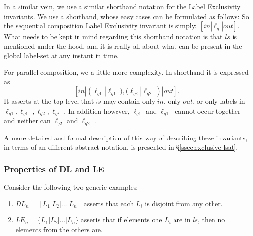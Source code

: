 In a similar vein, we use a similar shorthand notation
for the Label Exclusivity invariants.
We use a shorthand,
whose easy cases can be formulated as follows:
So the sequential composition Label Exclusivity invariant
is simply: $[in|\ell_g|out]$.
What needs to be kept in mind regarding this shorthand notation
is that $ls$ is mentioned under the hood,
and it is really all about what can be present in the global label-set
at any instant in time.

For parallel composition, we a little more complexity.
In shorthand it is expressed as
\[
   [in|(\ell_{g1}|\ell_{g1:}),(\ell_{g2}|\ell_{g2:})|out].
\]
It asserts at the top-level that $ls$
may contain only $in$, only $out$,
or only labels in $\ell_{g1},\ell_{g1:},\ell_{g2},\ell_{g2:}$.
In addition however, $\ell_{g1}$ and $\ell_{g1:}$ cannot occur together
and neither can $\ell_{g2}$ and $\ell_{g2:}$.

A more detailed and formal description of this way of describing
these invariants, in terms of an different abstract notation,
is presented in \S\ref{ssec:exclusive-lsat}.

\subsubsection{Properties of DL and LE}

Consider the following two generic examples:
\begin{enumerate}
  \item
    $DL_n = [L_1|L_2|\dots|L_n]$
    asserts that each $L_i$ is disjoint from any other.
  \item
    $LE_n = \{L_1|L_2|\dots|L_n\}$
    asserts that if elements one $L_i$ are in $ls$,
    then no elements from the others are.
\end{enumerate}

